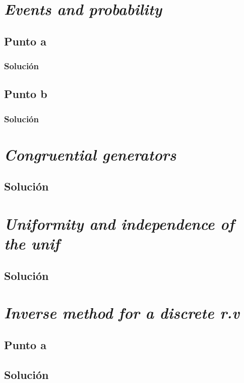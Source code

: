 \documentclass[12pt]{article}
\begin{document}
\tableofcontents


\section{\textit{Events and probability}}
\subsection{Punto a}
\subsubsection{Solución}

\subsection{Punto b}
\subsubsection{Solución}

\section{\textit{Congruential generators}}
\subsection{Solución}

\section{\textit{Uniformity and independence of the unif}}
\subsection{Solución}

\section{\textit{Inverse method for a discrete r.v}}

\subsection{Punto a}
\subsection{Solución}
\end{document}
